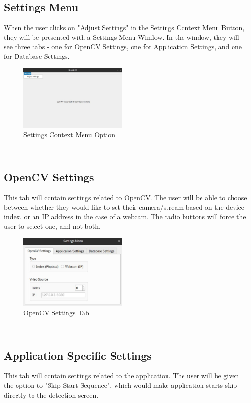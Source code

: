 \documentclass[conference]{IEEEtran}
\begin{document}
\subsection{Settings Menu}
When the user clicks on "Adjust Settings" in the Settings Context Menu Button, they will be presented with a Settings Menu Window. In the window, they will see three tabs - one for OpenCV Settings, one for Application Settings, and one for Database Settings.~\\

\begin{figure}[h]
    \centering
    \includegraphics[width=0.48\textwidth]{images/settings_context_menu.eps}
    \caption{Settings Context Menu Option}
\end{figure}~\\

\subsection{OpenCV Settings}
This tab will contain settings related to OpenCV. The user will be able to choose between whether they would like to set their camera/stream based on the device index, or an IP address in the case of a webcam. The radio buttons will force the user to select one, and not both.~\\

\begin{figure}[h]
    \centering
    \includegraphics[width=0.48\textwidth]{images/settings_1.eps}
    \caption{OpenCV Settings Tab}
\end{figure}~\\

\subsection{Application Specific Settings}
This tab will contain settings related to the application. The user will be given the option to "Skip Start Sequence", which would make application starts skip directly to the detection screen.
\end{document}
